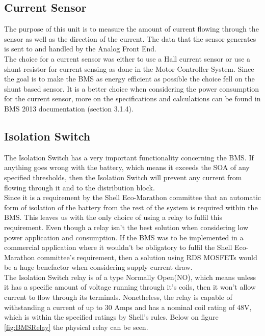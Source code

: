 \subsection{Current Sensor}
The purpose of this unit is to measure the amount of current flowing through the sensor as well as the direction of the current. The data that the sensor generates is sent to and handled by the Analog Front End. \\
The choice for a current sensor was either to use a Hall current sensor or use a shunt resistor for current sensing as done in the Motor Controller System. Since the goal is to make the BMS as energy efficient as possible the choice fell on the shunt based sensor. It is a better choice when considering the power consumption for the current sensor, more on the specifications and calculations can be found in BMS 2013 documentation \cite{BMSDocumentation} (section 3.1.4).

\subsection{Isolation Switch}
The Isolation Switch has a very important functionality concerning the BMS. If anything goes wrong with the battery, which means it exceeds the SOA of any specified thresholds, then the Isolation Switch will prevent any current from flowing through it and to the distribution block. \\
Since it is a requirement by the Shell Eco-Marathon committee that an automatic form of isolation of the battery from the rest of the system is required within the BMS. This leaves us with the only choice of using a relay to fulfil this requirement. Even though a relay isn't the best solution when considering low power application and consumption. If the BMS was to be implemented in a commercial application where it wouldn't be obligatory to fulfil the Shell Eco-Marathon committee's requirement, then a solution using RDS MOSFETs would be a huge benefactor when considering supply current draw.\\
The Isolation Switch relay is of a type Normally Open(NO), which means unless it has a specific amount of voltage running through it's coils, then it won't allow current to flow through its terminals. Nonetheless, the relay is  capable of withstanding a current of up to 30 Amps and has a nominal coil rating of 48V, which is within the specified ratings by Shell's rules. Below on figure \vref{fig:BMSRelay} the physical relay can be seen.

